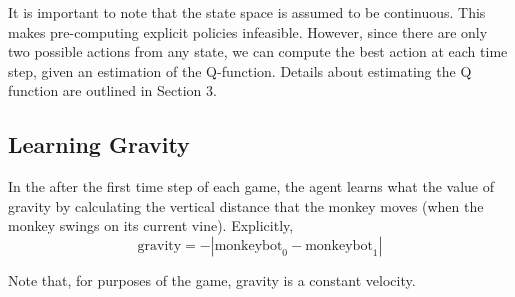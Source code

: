 \documentclass[11pt, oneside]{article}   	%
\begin{document}
It is important to note that the state space is assumed to be continuous.  This makes pre-computing explicit policies infeasible.  However, since there are only two possible actions from any state, we can compute the best action at each time step, given an estimation of the Q-function.  Details about estimating the Q function are outlined in Section 3.
\subsection{Learning Gravity}
In the after the first time step of each game, the agent learns what the value of gravity by calculating the vertical distance that the monkey moves (when the monkey swings on its current vine).  Explicitly,
$$\text{gravity} = -|\text{monkeybot}_{0} - \text{monkeybot}_{1}|$$

Note that, for purposes of the game, gravity is a constant velocity.
\end{document}
